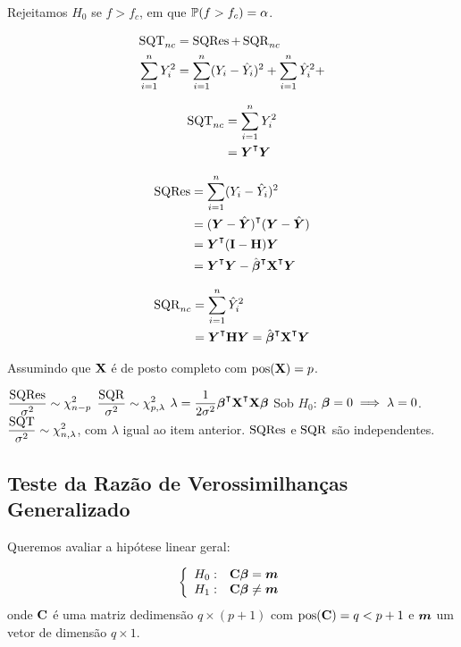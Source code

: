 Rejeitamos $H_0$ se $f > f_c$, em que $\P(f>f_c)=\alpha$.


\begin{align}
	\sqt_{nc} &= \sqres + \sqr_{nc}  \\
	\sum_{i=1}^n Y_i^2 &= 
	\sum_{i=1}^n (Y_i-\hat{Y}_i)^2 +
	\sum_{i=1}^n \hat{Y}_i^2 + 
\end{align}

\begin{align}
	\sqt_{nc} &= \sum_{i=1}^n Y_i^2 \\
	&= \v{Y}\T \v{Y}
\end{align}

\begin{align}
	\sqres &= \sum_{i=1}^n (Y_i - \hat{Y}_i)^2 \\
	&= (\v{Y}-\hat{\v{Y}})\T (\v{Y}-\hat{\v{Y}}) \\
	&= \v{Y}\T (\m{I}-\m{H}) \v{Y} \\
	&= \v{Y}\T \v{Y} - \hat{\v{\beta}}\T \m{X}\T \v{Y}
\end{align}

\begin{align}
	\sqr_{nc} &= \sum_{i=1}^n \hat{Y}_i^2 \\
	&= \v{Y}\T \m{H} \v{Y} = \hat{\v{\beta}}\T\m{X}\T\v{Y}
\end{align}

\begin{theorem}
	Assumindo que $\m{X}$ é de posto completo com $\pos(\m{X}) = p$.
	\leavevmode
	\begin{outline}[enumerate]
		\1 \(\displaystyle \frac{\sqres}{\sigma^2} \sim \chidist{n-p}  \)
		\1 \(\displaystyle \frac{\sqr}{\sigma^2} \sim \chidist{p, \lambda} \)
		\2 \(\displaystyle \lambda = \frac{1}{2\sigma^2}\v{\beta}\T \m{X}\T \m{X} \v{\beta}\)
		\2 Sob $H_0$: $\v\beta=0 \implies \lambda=0$.
		\1 \( \displaystyle \frac{\sqt}{\sigma^2} \sim \chidist{n, \lambda}  \), com $\lambda$ igual ao item anterior.
		\1 $\sqres$ e $\sqr$ são independentes.
	\end{outline}
\end{theorem}



\subsection{Teste da Razão de Verossimilhanças Generalizado}

Queremos avaliar a hipótese linear geral:

\begin{equation}
	\left\{ \begin{array}{ll} 
		H_0: & \m{C} \v\beta = \v{m} \\
		H_1: & \m{C} \v\beta \neq \v{m} 
	\end{array} \right.
\end{equation}
%
onde $\m{C}$ é uma matriz dedimensão $q \times (p+1)$ com $\pos(\m{C})=q<p+1$ e $\v{m}$ um vetor de dimensão $q \times 1$.

